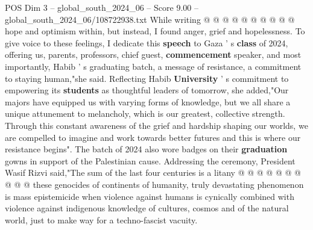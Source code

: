 \begin{textsample}{POS Dim 3 – global\_south\_2024\_06 – Score 9.00 – global\_south\_2024\_06/108722938.txt}
While writing @ @ @ @ @ @ @ @ @ @ hope and optimism within, but instead, I found anger, grief and hopelessness.
To give voice to these feelings, I dedicate this \textbf{speech} to Gaza ' s \textbf{class} of 2024, offering us, parents, professors, chief guest, \textbf{commencement} speaker, and most importantly, Habib ' s graduating batch, a message of resistance, a commitment to staying human,"she said.
Reflecting Habib \textbf{University} ' s commitment to empowering its \textbf{students} as thoughtful leaders of tomorrow, she added,"Our majors have equipped us with varying forms of knowledge, but we all share a unique attunement to melancholy, which is our greatest, collective strength.
Through this constant awareness of the grief and hardship shaping our worlds, we are compelled to imagine and work towards better futures and this is where our resistance begins".
The batch of 2024 also wore badges on their \textbf{graduation} gowns in support of the Palestinian cause.
Addressing the ceremony, President Wasif Rizvi said,"The sum of the last four centuries is a litany @ @ @ @ @ @ @ @ @ @ these genocides of continents of humanity, truly devastating phenomenon is mass epistemicide when violence against humans is cynically combined with violence against indigenous knowledge of cultures, cosmos and of the natural world, just to make way for a techno-fascist vacuity.

\end{textsample}
